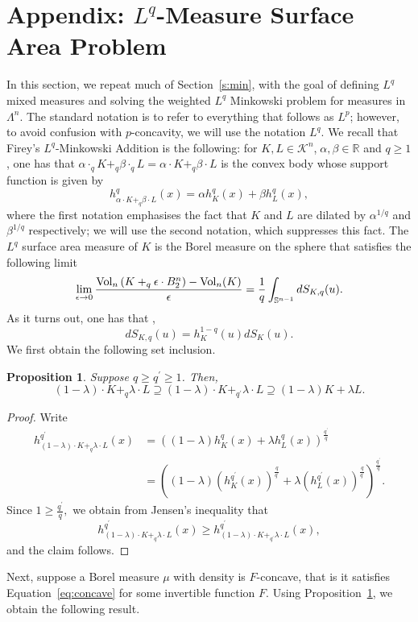 \documentclass[11pt]{amsart}
\newtheorem{proposition}[theorem]{Proposition}
\theoremstyle{definition}
\theoremstyle{remark}
\numberwithin{equation}{section}
\newcommand{\R}{\mathbb{R}}
\newcommand{\s}{\mathbb{S}}
\newcommand{\conbod}{\mathcal{K}^n}
\newcommand{\vol}{\text{\rm Vol}}
\begin{document}
\section{Appendix: $L^q$-Measure Surface Area Problem}
In this section, we repeat much of Section~\ref{s:min}, with the goal of defining $L^q$ mixed measures and solving the weighted $L^q$ Minkowski problem for measures in $\Lambda^n$. The standard notation is to refer to everything that follows as $L^p$; however, to avoid confusion with $p$-concavity, we will use the notation $L^q$. We recall that Firey's $L^q$-Minkowski Addition is the following: for $K,L\in\conbod$,$\;\alpha,\beta\in\R$ and $q\geq 1$, one has that $\alpha\cdot_q K+_q \beta\cdot_q L=\alpha\cdot K+_q \beta\cdot L$ is the convex body whose support function is given by
$$h^q_{\alpha\cdot K+_q \beta\cdot L}(x)=\alpha h_K^q(x)+\beta h_L^q(x),$$
where the first notation emphasises the fact that $K$ and $L$ are dilated by $\alpha^{1/q}$ and $\beta^{1/q}$ respectively; we will use the second notation, which suppresses this fact.
The $L^q$ surface area measure of $K$ is the Borel measure on the sphere that satisfies the following limit
$$\lim_{\epsilon\to 0}\frac{\vol_n\left(K+_q\epsilon\cdot B_2^n\right)-\vol_n(K)}{\epsilon}=\frac{1}{q}\int_{\s^{n-1}}dS_{K,q}(u).$$
As it turns out, one has that \cite{Sh1},
$$dS_{K,q}(u)=h_K^{1-q}(u)dS_{K}(u).$$
We first obtain the following set inclusion.
\begin{proposition}
\label{p:q_set}
Suppose $q\geq q^\prime\geq 1$. Then,
$$(1-\lambda)\cdot K+_q \lambda\cdot L \supseteq (1-\lambda)\cdot K+_{q^\prime} \lambda\cdot L \supseteq (1-\lambda) K+ \lambda L.$$
\end{proposition}
\begin{proof}
Write
\begin{align*}h^{q^\prime}_{(1-\lambda)\cdot K+_q \lambda\cdot L}(x)&=\left((1-\lambda) h_K^q(x)+\lambda h_L^q(x)\right)^{\frac{q^\prime}{q}}
\\
&=\left((1-\lambda) (h_K^{q^\prime}(x))^{\frac{q}{q^\prime}}+\lambda (h_L^{q^\prime}(x))^{\frac{q}{q^\prime}}\right)^{\frac{q^\prime}{q}}.
\end{align*}
Since $1\geq \frac{q^\prime}{q},$ we obtain from Jensen's inequality that $$h^{q^\prime}_{(1-\lambda)\cdot K+_q \lambda\cdot L}(x)\geq h^{q^\prime}_{(1-\lambda)\cdot K+_{q^\prime} \lambda\cdot L}(x),$$ and the claim follows.
\end{proof}
Next, suppose a Borel measure $\mu$ with density is $F$-concave, that is it satisfies Equation~\ref{eq:concave} for some invertible function $F$. Using Proposition~\ref{p:q_set}, we obtain the following result.
\end{document}
